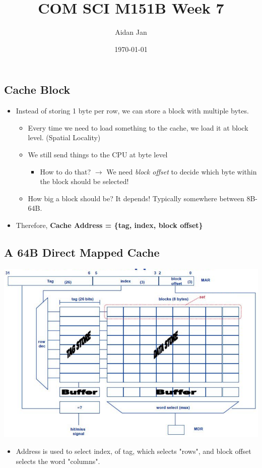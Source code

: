 \documentclass[10pt]{article}
\title{COM SCI M151B Week 7}
\author{Aidan Jan}
\date{\today}
\begin{document}
\maketitle

\subsection*{Cache Block}
\begin{itemize}
    \item Instead of storing 1 byte per row, we can store a block with multiple bytes.
    \begin{itemize}
        \item Every time we need to load something to the cache, we load it at block level.  (Spatial Locality)
        \item We still send things to the CPU at byte level
        \begin{itemize}
            \item How to do that? $\rightarrow$ We need \textit{block offset} to decide which byte within the block should be selected!
        \end{itemize}
        \item How big a block should be?  It depends!  Typically somewhere between 8B-64B.
    \end{itemize}
    \item Therefore, \textbf{Cache Address = \{tag, index, block offset\}}
\end{itemize}
\subsection*{A 64B Direct Mapped Cache}
\begin{center}
    \includegraphics*[scale=0.8]{W7_1.png}
\end{center}
\begin{itemize}
    \item Address is used to select index, of tag, which selects "rows", and block offset selects the word "columns".
\end{itemize}
\end{document}
